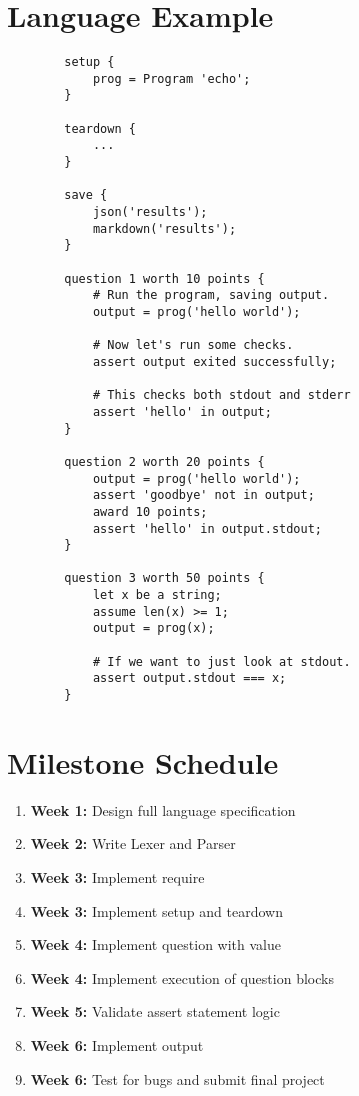 \documentclass{article}
\begin{document}
    \section{Language Example}
    \begin{lstlisting}
        setup {
            prog = Program 'echo';
        }

        teardown {
            ...
        }

        save {
            json('results');
            markdown('results');
        }

        question 1 worth 10 points {
            # Run the program, saving output.
            output = prog('hello world');

            # Now let's run some checks.
            assert output exited successfully;
            
            # This checks both stdout and stderr
            assert 'hello' in output;
        }

        question 2 worth 20 points {
            output = prog('hello world');
            assert 'goodbye' not in output;
            award 10 points;
            assert 'hello' in output.stdout;
        }

        question 3 worth 50 points {
            let x be a string;
            assume len(x) >= 1;
            output = prog(x);

            # If we want to just look at stdout.
            assert output.stdout === x;
        }
    \end{lstlisting}

    \section{Milestone Schedule}
    \begin{enumerate}
        \item {\bf Week 1:} Design full language specification
        \item {\bf Week 2:} Write Lexer and Parser
        \item {\bf Week 3:} Implement require
        \item{\bf Week 3:}  Implement setup and teardown
        \item {\bf Week 4:} Implement question with value
        \item {\bf Week 4:} Implement execution of question blocks
        \item {\bf Week 5:} Validate assert statement logic
        \item {\bf Week 6:} Implement output
        \item {\bf Week 6:} Test for bugs and submit final project
    \end{enumerate}
\end{document}
